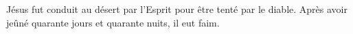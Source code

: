 \encetemps
	Jésus fut conduit au désert par l’Esprit pour être tenté par le diable.
Après avoir jeûné quarante jours et quarante nuits, il eut faim.
